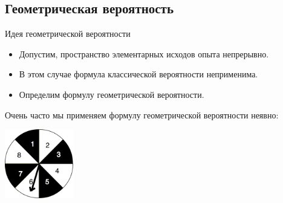 \documentclass[unicode,11pt,notheorems,xcolor=table]{beamer}
\begin{document}
\subsection{Геометрическая вероятность}
\begin{frame}{Идея геометрической вероятности}
    \begin{itemize}
        \item Допустим, пространство элементарных исходов опыта непрерывно.
        \item В этом случае формула классической вероятности неприменима.
        \item Определим формулу геометрической вероятности.
    \end{itemize}
    
    \bigskip
    Очень часто мы применяем формулу геометрической вероятности неявно:

    {\centering \includegraphics[width=3cm]{roulette.png} \par}

\end{frame}
\end{document}
